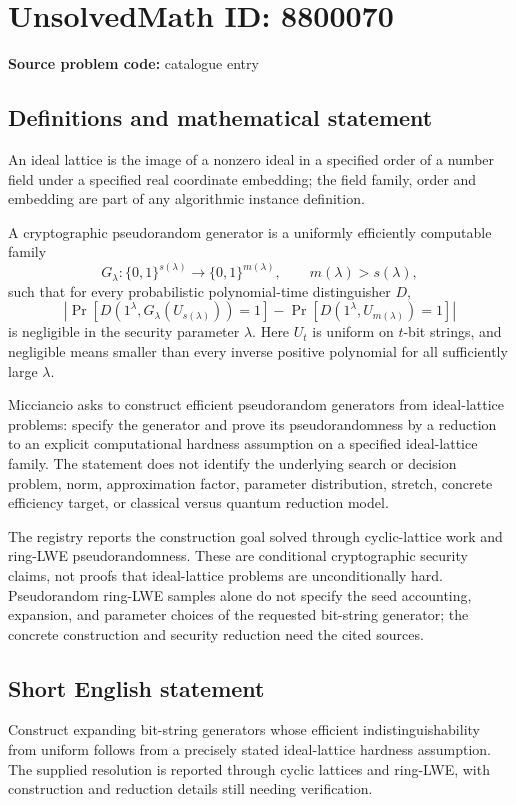 \documentclass[11pt]{article}
\begin{document}
\section*{UnsolvedMath ID: 8800070}
\textbf{Source problem code:} catalogue entry
\subsection{Definitions and mathematical statement}
An ideal lattice is the image of a nonzero ideal in a specified order of a number field under a specified real coordinate embedding; the field family, order and embedding are part of any algorithmic instance definition.

A cryptographic pseudorandom generator is a uniformly efficiently computable family
\[
 G_\lambda:\{0,1\}^{s(\lambda)}\to\{0,1\}^{m(\lambda)},\qquad m(\lambda)>s(\lambda),
\]
such that for every probabilistic polynomial-time distinguisher \(D\),
\[
 \left|\Pr[D(1^\lambda,G_\lambda(U_{s(\lambda)}))=1]
 -\Pr[D(1^\lambda,U_{m(\lambda)})=1]\right|
\]
is negligible in the security parameter \(\lambda\). Here \(U_t\) is uniform on \(t\)-bit strings, and negligible means smaller than every inverse positive polynomial for all sufficiently large \(\lambda\).

Micciancio asks to construct efficient pseudorandom generators from ideal-lattice problems: specify the generator and prove its pseudorandomness by a reduction to an explicit computational hardness assumption on a specified ideal-lattice family. The statement does not identify the underlying search or decision problem, norm, approximation factor, parameter distribution, stretch, concrete efficiency target, or classical versus quantum reduction model.

The registry reports the construction goal solved through cyclic-lattice work and ring-LWE pseudorandomness. These are conditional cryptographic security claims, not proofs that ideal-lattice problems are unconditionally hard. Pseudorandom ring-LWE samples alone do not specify the seed accounting, expansion, and parameter choices of the requested bit-string generator; the concrete construction and security reduction need the cited sources.
\subsection{Short English statement}
Construct expanding bit-string generators whose efficient indistinguishability from uniform follows from a precisely stated ideal-lattice hardness assumption. The supplied resolution is reported through cyclic lattices and ring-LWE, with construction and reduction details still needing verification.
\end{document}
